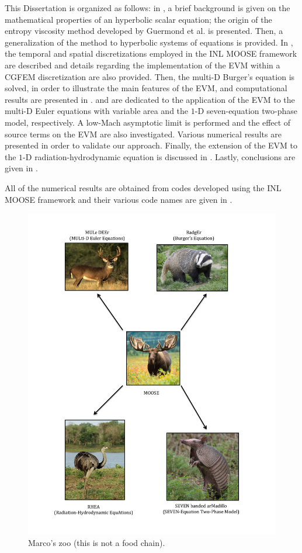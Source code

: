 This Dissertation is organized as follows: in , a brief background is given on the mathematical properties of an hyperbolic scalar equation; the origin of the entropy viscosity method developed by Guermond et al. \cite{jlg1} is presented. Then, a generalization of the method to hyperbolic systems of equations is provided. In , the temporal and spatial discretizations employed in the INL MOOSE framework \cite{Moose} are described and details regarding the implementation of the EVM within a CGFEM discretization are also provided. Then, the multi-D Burger's equation is solved, in order to illustrate the main features of the EVM, and computational results are presented in .  and  are dedicated to the application of the EVM to the multi-D Euler equations with variable area and the $1$-D seven-equation two-phase model, respectively. A low-Mach asymptotic limit is performed and the effect of source terms on the EVM are also investigated. Various numerical results are presented in order to validate our approach. Finally, the extension of the EVM to the $1$-D radiation-hydrodynamic equation is discussed in . Lastly, conclusions are given in  . 

All of the numerical results are obtained from codes developed using the INL MOOSE framework \cite{Moose} and their various code names are given in .
%
\begin{figure}[H]
\centering
\includegraphics[width=\textwidth]{figures/organigram.pdf}
\caption{Marco's zoo (this is not a food chain). \label{fig:organigram}}
\end{figure}
%